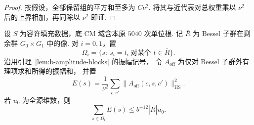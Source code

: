 \begin{proof}
按假设，全部保留组的平方和至多为 $C\nu^2$.
将其与近代表对总权重乘以 $\nu^2$ 后的上界相加，再同除以 $\nu^2$ 即证.
\end{proof}

\begin{lemma}
\label{lem:b-bessel-remainder}
\emitthmsource
设 $S$ 为容许填充数据，底 CM 域含本原 $5040$ 次单位根.
记 $\overline R$ 为 Bessel 子群在剩余群 $G_0\times G_1$ 中的像.
对 $i=0,1$，置
\[
 \Omega_i=\{s:\ s_i=t_i\ \text{对某个 }t\in\overline R\}.
\]
沿用引理~\ref{lem:b-amplitude-blocks} 的振幅记号，
令 $A_{\mathrm{off}}$ 为仅对 Bessel 子群外有理项求和所得的振幅和，
并置
\[
 E(s)=\frac{1}{\nu^2}\sum_{c,c'}\|A_{\mathrm{off}}(c,s,c')\|_{\mathrm{HS}}^2 .
\]
若 $u_0$ 为全源维数，则
\[
 \sum_{s\in\Omega_i}E(s)\le b^{-12}|\overline R|u_0.
\]
\end{lemma}
